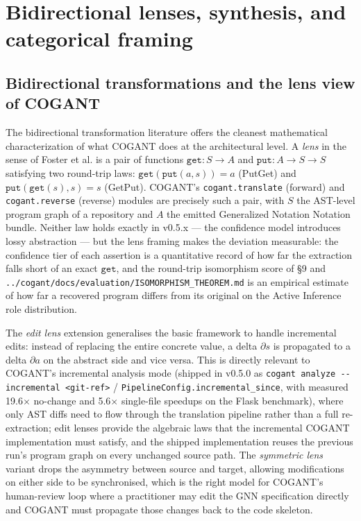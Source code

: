 \documentclass[
]{article}
\begin{document}
\newpage

\section{Bidirectional lenses, synthesis, and categorical
framing}\label{bidirectional-lenses-synthesis-and-categorical-framing}

\subsection{Bidirectional transformations and the lens view of
COGANT}\label{bidirectional-transformations-and-the-lens-view-of-cogant}

The bidirectional transformation literature offers the cleanest
mathematical characterization of what COGANT does at the architectural
level. A \emph{lens} in the sense of Foster et al.
\citep{foster2007lenses} is a pair of functions
\(\texttt{get} : S \to A\) and \(\texttt{put} : A \to S \to S\)
satisfying two round-trip laws: \(\texttt{get}(\texttt{put}(a, s)) = a\)
(PutGet) and \(\texttt{put}(\texttt{get}(s), s) = s\) (GetPut). COGANT's
\texttt{cogant.translate} (forward) and \texttt{cogant.reverse}
(reverse) modules are precisely such a pair, with \(S\) the AST-level
program graph of a repository and \(A\) the emitted Generalized Notation
Notation bundle. Neither law holds exactly in v0.5.x --- the confidence
model introduces lossy abstraction --- but the lens framing makes the
deviation measurable: the confidence tier of each assertion is a
quantitative record of how far the extraction falls short of an exact
\(\texttt{get}\), and the round-trip isomorphism score of §9 and
\texttt{../cogant/docs/evaluation/ISOMORPHISM\_THEOREM.md} is an
empirical estimate of how far a recovered program differs from its
original on the Active Inference role distribution.

The \emph{edit lens} extension \citep{hofmann2011edit} generalises the
basic framework to handle incremental edits: instead of replacing the
entire concrete value, a delta \(\partial s\) is propagated to a delta
\(\partial a\) on the abstract side and vice versa. This is directly
relevant to COGANT's incremental analysis mode (shipped in v0.5.0 as
\texttt{cogant\ analyze\ -\/-incremental\ \textless{}git-ref\textgreater{}}
/ \texttt{PipelineConfig.incremental\_since}, with measured
19.6\(\times\) no-change and 5.6\(\times\) single-file speedups on the
Flask benchmark), where only AST diffs need to flow through the
translation pipeline rather than a full re-extraction; edit lenses
provide the algebraic laws that the incremental COGANT implementation
must satisfy, and the shipped implementation reuses the previous run's
program graph on every unchanged source path. The \emph{symmetric lens}
variant \citep{diskin2011symmetric} drops the asymmetry between source
and target, allowing modifications on either side to be synchronised,
which is the right model for COGANT's human-review loop where a
practitioner may edit the GNN specification directly and COGANT must
propagate those changes back to the code skeleton.
\end{document}
